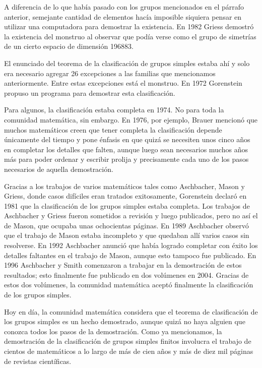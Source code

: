 A diferencia de lo que había pasado con los grupos mencionados en el párrafo
anterior, semejante cantidad de elementos hacía imposible siquiera pensar en
utilizar una computadora para demostrar la existencia. En 1982 Griess demostró
la existencia del monstruo al observar que podía verse como el grupo de
simetrías de un cierto espacio de dimensión 196883. 

El enunciado del teorema de la clasificación de grupos simples estaba ahí y
solo era necesario agregar 26 excepciones a las familias que mencionamos
anteriormente. Entre estas excepciones está el monstruo. En 1972 Gorenstein
propuso un programa para demostrar esta clasificación. 

Para algunos, la clasificación estaba completa en 1974. No para toda la
comunidad matemática, sin embargo. En 1976, por ejemplo, Brauer mencionó que
muchos matemáticos creen que tener completa la clasificación depende únicamente
del tiempo y pone énfasis en
que quizá se necesiten unos cinco años en completar los detalles que falten,
aunque luego sean necesarios muchos años más para poder ordenar y escribir
prolija y precisamente cada uno de los pasos necesarios de aquella demostración. 

Gracias a los trabajos de varios matemáticos tales como Aschbacher, Mason y
Griess, donde casos difíciles eran tratados exitosamente, Gorenstein declaró en
1981 que la clasificación de los grupos simples estaba completa. Los trabajos
de Aschbacher y Griess fueron sometidos a revisión y luego publicados, pero no
así el de Mason, que ocupaba unas ochocientas páginas.  En 1989 Aschbacher
observó que el trabajo de Mason estaba incompleto y que quedaban allí varios casos
sin resolverse. En 1992 Aschbacher anunció que había logrado completar con
éxito los detalles faltantes en el trabajo de Mason, aunque esto tampoco fue
publicado. En 1996 Aschbacher y Smith comenzaron a trabajar en la demostración 
de estos resultados; esto finalmente fue publicado en dos volúmenes en 2004. Gracias
de estos dos volúmenes, 
la comunidad matemática aceptó finalmente la clasificación de los
grupos simples. 

Hoy en día, la comunidad matemática considera que el 
teorema de clasificación de los grupos
simples es un hecho demostrado, aunque quizá no haya alguien que conozca todos
los pasos de la demostración. Como ya mencionamos, la demostración 
de la clasificación de grupos simples finitos involucra el trabajo de cientos de
matemáticos a lo largo de más de cien años y más de diez mil páginas de
revistas científicas. 


